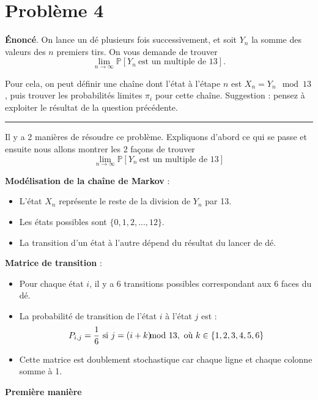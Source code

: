 \documentclass{article}
\begin{document}
\section*{Problème 4}
    \textbf{Énoncé}. On lance un dé plusieurs fois successivement, et soit $Y_n$ la somme des valeurs des $n$ premiers tirs. On vous demande de trouver
    \[
        \lim_{n\to\infty} \mathbb{P}[Y_n\ \text{est un multiple de 13}].
    \]
    
    Pour cela, on peut définir une chaîne dont l'état à l'étape $n$ est \(X_n = Y_n \mod 13\), puis trouver les probabilités limites $\pi_i$ pour cette chaîne. Suggestion : pensez à exploiter le résultat de la question précédente.

    \vspace{.5cm}
    \hrule
    \vspace{.5cm}

    Il y a 2 manières de résoudre ce problème. Expliquons d'abord ce qui se passe et ensuite nous allons montrer les 2 façons de trouver
    \[
        \lim_{n\to\infty} \mathbb{P}[Y_n\ \text{est un multiple de 13}]
    \]

    \textbf{Modélisation de la chaîne de Markov} :
    \begin{itemize}[left=1cm]
        \item L'état $X_n$ représente le reste de la division de $Y_n$ par 13.
        \item Les états possibles sont $\{0, 1, 2, ..., 12\}$.
        \item La transition d'un état à l'autre dépend du résultat du lancer de dé.
    \end{itemize}

    \textbf{Matrice de transition} :
    \begin{itemize}[left=1cm]
        \item Pour chaque état $i$, il y a 6 transitions possibles correspondant aux 6 faces du dé.
        \item La probabilité de transition de l'état $i$ à l'état $j$ est :
        \[ P_{i,j} = \frac{1}{6} \text{ si } j = (i + k)\hspace{-.3cm} \mod 13, \text{ où } k \in \{1,2,3,4,5,6\} \]
        \item Cette matrice est doublement stochastique car chaque ligne et chaque colonne somme à 1.
    \end{itemize} 

    \vspace{.4cm}
    {\large \textbf{Première manière}} 
\end{document}
